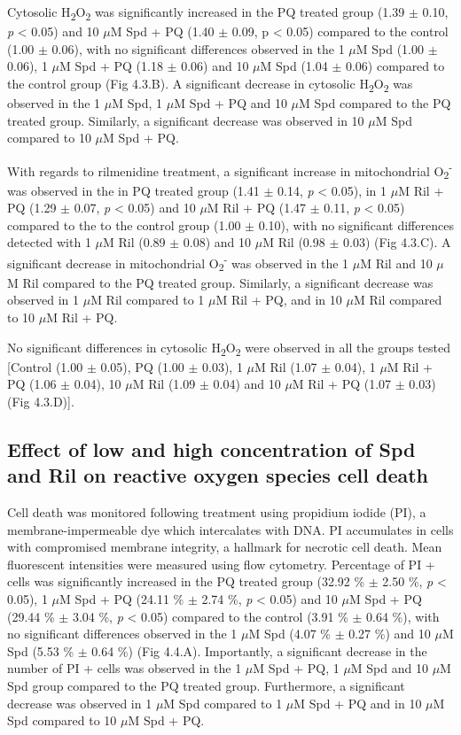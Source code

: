 Cytosolic H\textsubscript{2}O\textsubscript{2} was significantly increased in the PQ treated group (1.39 $\pm$ 0.10, \textit{p} < 0.05) and 10 $\mu$M Spd + PQ (1.40 $\pm$ 0.09, p < 0.05) compared to the control (1.00 $\pm$ 0.06), with no significant differences observed in the 1 $\mu$M Spd (1.00 $\pm$ 0.06), 1 $\mu$M Spd + PQ (1.18 $\pm$ 0.06) and 10 $\mu$M Spd (1.04 $\pm$ 0.06) compared to the control group (Fig 4.3.B). A significant decrease in cytosolic H\textsubscript{2}O\textsubscript{2} was observed in the 1 $\mu$M Spd, 1 $\mu$M Spd + PQ and 10 $\mu$M Spd compared to the PQ treated group. Similarly, a significant decrease was observed in 10 $\mu$M Spd compared to 10 $\mu$M Spd + PQ.

With regards to rilmenidine treatment, a significant increase in mitochondrial O\textsubscript{2}\textsuperscript{-} was observed in the 
in PQ treated group (1.41 $\pm$ 0.14, \textit{p} < 0.05), in 1 $\mu$M Ril + PQ (1.29 $\pm$ 0.07, \textit{p} < 0.05) and 10 $\mu$M Ril + PQ (1.47 $\pm$ 0.11, \textit{p} < 0.05) compared to the to the control group (1.00 $\pm$ 0.10), with no significant differences detected with 1 $\mu$M Ril (0.89 $\pm$ 0.08) and 10 $\mu$M Ril (0.98 $\pm$ 0.03) (Fig 4.3.C). A significant decrease in mitochondrial O\textsubscript{2}\textsuperscript{-} was observed in the 1 $\mu$M Ril and 10 $\mu$M Ril compared to the PQ treated group. Similarly, a significant decrease was observed in 1 $\mu$M Ril compared to 1 $\mu$M Ril + PQ, and in 10 $\mu$M Ril compared to 10 $\mu$M Ril + PQ. 

No significant differences in cytosolic H\textsubscript{2}O\textsubscript{2} were observed in all the groups tested [Control (1.00 $\pm$ 0.05), PQ (1.00 $\pm$ 0.03), 1 $\mu$M Ril (1.07 $\pm$ 0.04), 1 $\mu$M Ril + PQ (1.06 $\pm$ 0.04), 10 $\mu$M Ril (1.09 $\pm$ 0.04) and 10 $\mu$M Ril + PQ (1.07 $\pm$ 0.03) (Fig 4.3.D)].

\subsection{Effect of low and high concentration of Spd and Ril on reactive oxygen species cell death} 
Cell death was monitored following treatment using propidium iodide (PI), a membrane-impermeable dye which intercalates with DNA. PI accumulates in cells with compromised membrane integrity, a hallmark for necrotic cell death. Mean fluorescent intensities were measured using flow cytometry. Percentage of PI + cells was significantly increased in the PQ treated group (32.92 \% $\pm$ 2.50 \%, \textit{p} < 0.05), 1 $\mu$M Spd + PQ (24.11 \% $\pm$ 2.74 \%, \textit{p} < 0.05) and 10 $\mu$M Spd + PQ (29.44 \% $\pm$ 3.04 \%, \textit{p} < 0.05) compared to the control (3.91 \% $\pm$ 0.64 \%), with no significant differences observed in the 1 $\mu$M Spd (4.07 \% $\pm$ 0.27 \%) and 10 $\mu$M Spd (5.53 \% $\pm$ 0.64 \%) (Fig 4.4.A). Importantly, a significant decrease in the number of PI + cells was observed in the 1 $\mu$M Spd + PQ, 1 $\mu$M Spd and 10 $\mu$M Spd group compared to the PQ treated group. Furthermore, a significant decrease was observed in 1 $\mu$M Spd compared to 1 $\mu$M Spd + PQ and in 10 $\mu$M Spd compared to 10 $\mu$M Spd + PQ.

